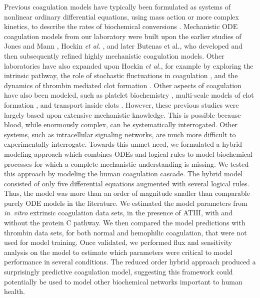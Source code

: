 \documentclass[processes,article,received,moreauthors,pdftex,12pt,a4paper]{mdpi}
\begin{document}
Previous coagulation models have typically been formulated as systems of nonlinear ordinary differential equations, 
using mass action or more complex kinetics, to describe the rates of biochemical conversions \citep{Khanin:1989aa,Willems:1991aa,Baldwin:1994aa,Leipold:1995aa,Kuharsky:2001aa}.
Mechanistic ODE coagulation models from our laboratory \citep{Luan:2007aa,2010_luan_varner_MolBioSys} 
were built upon the earlier studies of Jones and Mann \citep{Jones:1994aa}, Hockin \emph{et al.} \citep{Hockin:2002aa}, and later Butenas et al., \citep{Butenas:2004aa}
who developed and then subsequently refined highly mechanistic coagulation models. 
Other laboratories have also expanded upon Hockin \emph{et al.}, for example by exploring the intrinsic pathway, the role of stochastic fluctuations in coagulation \citep{Lo:2005aa},
and the dynamics of thrombin mediated clot formation \citep{Chatterjee:2010aa}. 
Other aspects of coagulation have also been modeled, such as platelet biochemistry \citep{Stalker:2013aa}, 
multi-scale models of clot formation \citep{Leiderman:2014aa, Bannish:2014ab}, and transport inside clots \citep{Voronov:2013aa}.
However, these previous studies were largely based upon extensive mechanistic knowledge. 
This is possible because blood, while enormously complex, can be systematically interrogated.
Other systems, such as intracellular signaling networks, are much more difficult to experimentally interrogate.  
Towards this unmet need, we formulated a hybrid modeling approach which combines ODEs and logical rules to model 
biochemical processes for which a complete mechanistic understanding is missing. 
We tested this approach by modeling the human coagulation cascade. 
The hybrid model consisted of only five differential equations augmented with several logical rules.
Thus, the model was more than an order of magnitude smaller than comparable purely ODE models in the literature.
We estimated the model parameters from \textit{in~vitro} extrinsic coagulation data sets, in the presence of ATIII, with and without the protein C pathway. 
We then compared the model predictions with thrombin data sets, for both normal and hemophilic coagulation, that were not used for model training.
Once validated, we performed flux and sensitivity analysis on the model to estimate which parameters were critical to model performance in several conditions. 
The reduced order hybrid approach produced a surprisingly predictive coagulation model, 
suggesting this framework could potentially be used to model other biochemical networks important to human health. 
\end{document}
